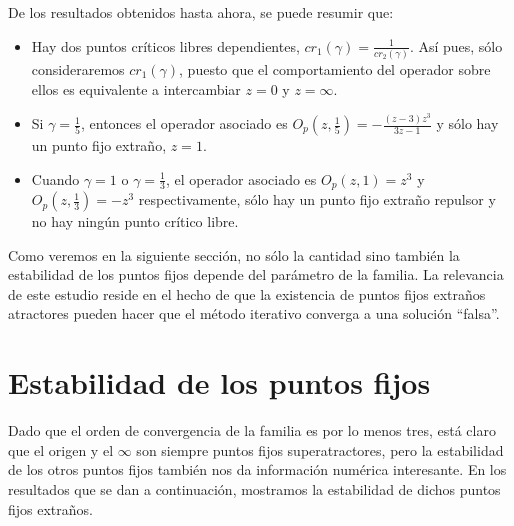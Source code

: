 De los resultados obtenidos hasta ahora, se puede resumir que:
\begin{itemize}
	\item Hay dos puntos críticos libres dependientes,  $cr_1(\gamma)=\frac{1}{cr_2(\gamma)}$. Así pues, sólo consideraremos $cr_1(\gamma)$, puesto que el comportamiento del operador sobre ellos es equivalente a intercambiar $z=0$ y $z=\infty$.
	\item Si $\gamma =\frac{1}{5}$, entonces el operador asociado es
	$O_{p}(z,\frac{1}{5})=-\frac{(z-3) z^3}{3 z-1}$ y sólo hay un punto fijo extraño, $z=1$.
	\item Cuando $\gamma=1$ o $\gamma=\frac{1}{3}$,  el operador asociado es
	$O_{p}(z,1)=z^3$ y $O_{p}(z,\frac{1}{3})=-z^3$ respectivamente, sólo hay un punto fijo extraño repulsor y no hay ningún punto crítico libre.
\end{itemize}

Como veremos en la siguiente sección, no sólo la cantidad sino también la estabilidad de los puntos fijos depende del parámetro de la familia. La relevancia de este estudio reside en el hecho de que la existencia de puntos fijos extraños atractores pueden hacer que el método iterativo converga a una  solución ``falsa''.

\section{Estabilidad de los puntos fijos}

Dado que el orden de convergencia de la familia es por lo menos tres, está claro que el origen y el $\infty$ son siempre puntos fijos superatractores, pero la estabilidad de los otros puntos fijos también nos da información numérica interesante. En los resultados que se dan a continuación, mostramos la estabilidad de dichos puntos fijos extraños.

